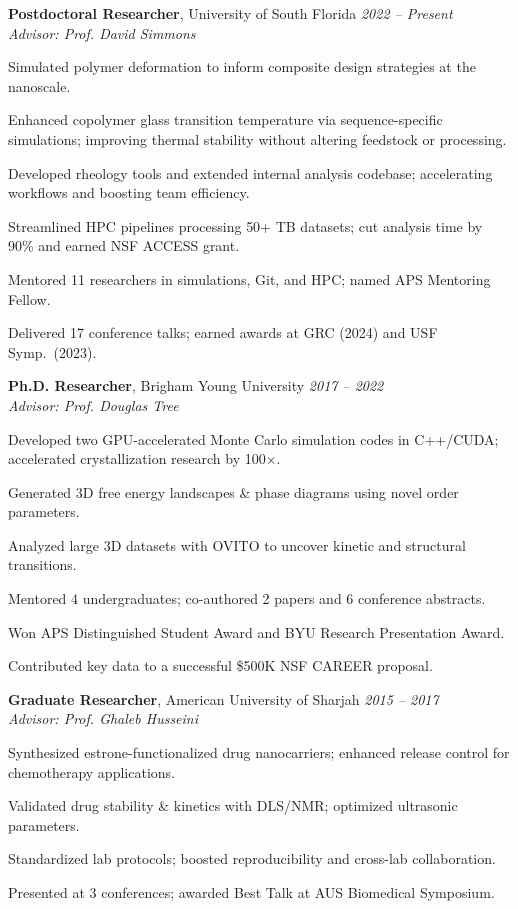 \documentclass[letterpaper,12pt]{article}
\begin{document}
\textbf{Postdoctoral Researcher}, University of South Florida \hfill \textit{2022 – Present} \\
\textit{Advisor: Prof. David Simmons}
\begin{tabitemize}[leftmargin=*]
  \item Simulated polymer deformation to inform composite design strategies at the nanoscale.
  \item Enhanced copolymer glass transition temperature via sequence-specific simulations; improving thermal stability without altering feedstock or processing.
  \item Developed rheology tools and extended internal analysis codebase; accelerating workflows and boosting team efficiency.
  \item Streamlined HPC pipelines processing 50+ TB datasets; cut analysis time by 90\% and earned NSF ACCESS grant.
  \item Mentored 11 researchers in simulations, Git, and HPC; named APS Mentoring Fellow.
  \item Delivered 17 conference talks; earned awards at GRC (2024) and USF Symp.~(2023).
\end{tabitemize}

\textbf{Ph.D. Researcher}, Brigham Young University \hfill \textit{2017 – 2022} \\
\textit{Advisor: Prof. Douglas Tree}
\begin{tabitemize}[leftmargin=*]
  \item Developed two GPU-accelerated Monte Carlo simulation codes in C++/CUDA; accelerated crystallization research by 100×.
  \item Generated 3D free energy landscapes \& phase diagrams using novel order parameters.
  \item Analyzed large 3D datasets with OVITO to uncover kinetic and structural transitions.
  \item Mentored 4 undergraduates; co-authored 2 papers and 6 conference abstracts.%
  \item Won APS Distinguished Student Award and BYU Research Presentation Award.
  \item Contributed key data to a successful \$500K NSF CAREER proposal.
\end{tabitemize}

\textbf{Graduate Researcher}, American University of Sharjah \hfill \textit{2015 – 2017} \\
\textit{Advisor: Prof. Ghaleb Husseini}
\begin{tabitemize}[leftmargin=*]
  \item Synthesized estrone-functionalized drug nanocarriers; enhanced release control for chemotherapy applications.
  \item Validated drug stability \& kinetics with DLS/NMR; optimized ultrasonic parameters.
  \item Standardized lab protocols; boosted reproducibility and cross-lab collaboration.
  \item Presented at 3 conferences; awarded Best Talk at AUS Biomedical Symposium.
\end{tabitemize}
\end{document}
